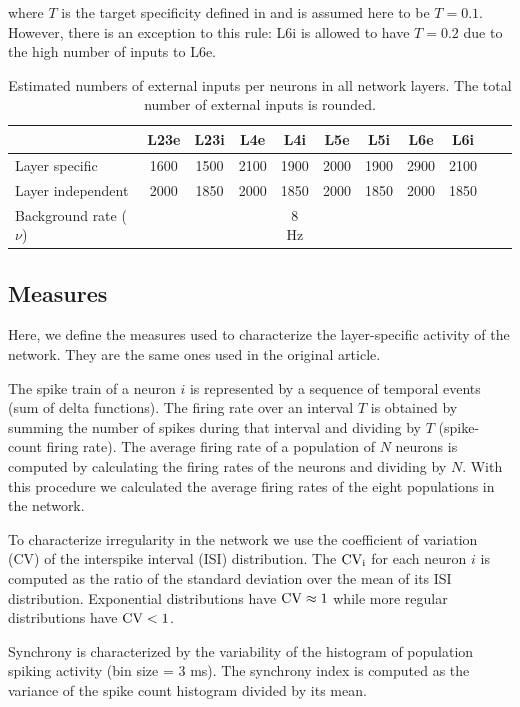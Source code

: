 \documentclass[10pt,a4paper,onecolumn]{article}
\begin{document}
\noindent where $T$ is the target specificity defined in \cite{potjans2014} and is assumed here to be $T=0.1$. However, there is an exception to this rule: L6i is allowed to have $T=0.2$ due to the high number of inputs to L6e.


\begin{table}[!ht]
\caption{\label{table:externalinput} Estimated numbers of external inputs per neurons in all network layers. The total number of external inputs is rounded.
}
\begin{center}
\begin{tabular}{lcccccccccc}
 \toprule
 \midrule
 & L23e & L23i & L4e & L4i & L5e & L5i & L6e & L6i
 \tabularnewline
 \midrule
 Layer specific & 1600 & 1500 & 2100 & 1900 & 2000 & 1900 & 2900 & 2100 \tabularnewline
 Layer independent & 2000 & 1850 & 2000 & 1850 & 2000 & 1850 & 2000 & 1850 \tabularnewline
 Background rate  ($\nu$) & & & & 8 Hz \tabularnewline
\bottomrule
\end{tabular}
\end{center}
\end{table}

\subsection{Measures}

Here, we define the measures used to characterize the layer-specific activity of the network. They are the same ones used in the original article.  

The spike train of a neuron $i$ is represented by a sequence of temporal events (sum of delta functions). The firing rate over an interval $T$ is obtained by summing the number of spikes during that interval and dividing by $T$ (spike-count firing rate). The average firing rate of a population of $N$ neurons is computed by calculating the firing rates of the neurons and dividing by $N$. With this procedure we calculated the average firing rates of the eight populations in the network.

To characterize irregularity in the network we use the coefficient of variation (CV) of the interspike interval (ISI) distribution. The $\rm CV_{\rm i}$ for each neuron $i$ is computed as the ratio of the standard deviation over the mean of its ISI distribution. Exponential distributions have $\rm CV \approx 1$ while more regular distributions have $\rm CV<1$. 

Synchrony is characterized by the variability of the histogram of population spiking activity (bin size = 3 ms). The synchrony index is computed as the variance of the spike count histogram divided by its mean.
\end{document}

